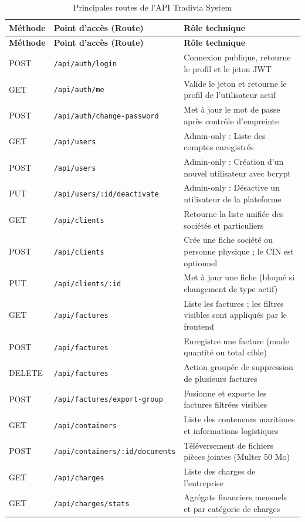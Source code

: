 \documentclass[12pt,a4paper,oneside]{report}
\newcommand{\code}[1]{\texttt{#1}}
\begin{document}
\small
\begin{longtable}{p{1.7cm}p{5.8cm}p{6.5cm}}
\caption{Principales routes de l'API Tradivia System}\\
\toprule \textbf{Méthode} & \textbf{Point d'accès (Route)} & \textbf{Rôle technique}\\ \midrule
\endfirsthead
\toprule \textbf{Méthode} & \textbf{Point d'accès (Route)} & \textbf{Rôle technique}\\ \midrule
\endhead
POST & \code{/api/auth/login} & Connexion publique, retourne le profil et le jeton JWT\\
GET & \code{/api/auth/me} & Valide le jeton et retourne le profil de l'utilisateur actif\\
POST & \code{/api/auth/change-password} & Met à jour le mot de passe après contrôle d'empreinte\\
GET & \code{/api/users} & Admin-only : Liste des comptes enregistrés\\
POST & \code{/api/users} & Admin-only : Création d'un nouvel utilisateur avec bcrypt\\
PUT & \code{/api/users/:id/deactivate} & Admin-only : Désactive un utilisateur de la plateforme\\
GET & \code{/api/clients} & Retourne la liste unifiée des sociétés et particuliers\\
POST & \code{/api/clients} & Crée une fiche société ou personne physique ; le CIN est optionnel\\
PUT & \code{/api/clients/:id} & Met à jour une fiche (bloqué si changement de type actif)\\
GET & \code{/api/factures} & Liste les factures ; les filtres visibles sont appliqués par le frontend\\
POST & \code{/api/factures} & Enregistre une facture (mode quantité ou total cible)\\
DELETE & \code{/api/factures} & Action groupée de suppression de plusieurs factures\\
POST & \code{/api/factures/export-group} & Fusionne et exporte les factures filtrées visibles\\
GET & \code{/api/containers} & Liste des conteneurs maritimes et informations logistiques\\
POST & \code{/api/containers/:id/documents} & Téléversement de fichiers pièces jointes (Multer 50 Mo)\\
GET & \code{/api/charges} & Liste des charges de l'entreprise\\
GET & \code{/api/charges/stats} & Agrégats financiers mensuels et par catégorie de charges\\

\end{longtable}
\end{document}
